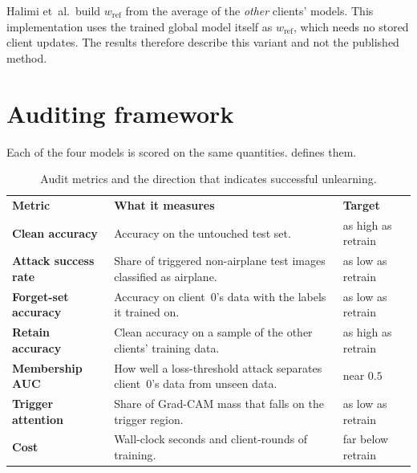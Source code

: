 \documentclass[11pt,a4paper]{article}
\newcommand{\thead}[1]{\textbf{\color{white}#1}}
\newcommand{\headrow}{\rowcolor{HeadingNavy}}
\begin{document}
\begin{cautionbox}
Halimi et~al.\ build $w_{\mathrm{ref}}$ from the average of the \emph{other}
clients' models. This implementation uses the trained global model itself as
$w_{\mathrm{ref}}$, which needs no stored client updates. The results
therefore describe this variant and not the published method.
\end{cautionbox}

\section{Auditing framework}
\label{sec:audit}
Each of the four models is scored on the same quantities. 
defines them.

\begin{table}[!htb]
\centering
\caption[Audit metrics]{Audit metrics and the direction that indicates
successful unlearning.}
\label{tab:metrics}
\begin{tabularx}{\textwidth}{@{}>{\bfseries\color{HeadingNavy}}l Y l@{}}
\headrow
\thead{\;Metric} & \thead{What it measures} & \thead{Target}\\
\;Clean accuracy & Accuracy on the untouched test set. & as high as retrain\\
\;Attack success rate & Share of triggered non-airplane test images classified as airplane. & as low as retrain\\
\;Forget-set accuracy & Accuracy on client~0's data with the labels it trained on. & as low as retrain\\
\;Retain accuracy & Clean accuracy on a sample of the other clients' training data. & as high as retrain\\
\;Membership AUC & How well a loss-threshold attack separates client~0's data from unseen data. & near $0.5$\\
\;Trigger attention & Share of Grad-CAM mass that falls on the trigger region. & as low as retrain\\
\;Cost & Wall-clock seconds and client-rounds of training. & far below retrain\\
\bottomrule
\end{tabularx}
\end{table}
\end{document}
